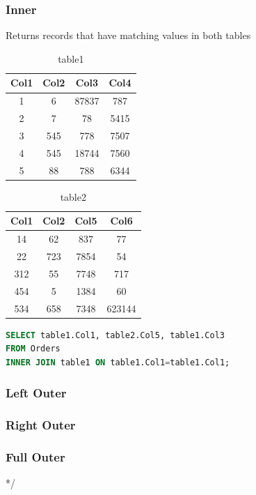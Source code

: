\documentclass{article}
\begin{document}
\subsubsection*{Inner}
Returns records that have matching values in both tables
\begin{table}
\begin{center}
 \begin{tabular}{|c c c c|} 
 \hline
 Col1 & Col2 & Col3 & Col4 \\ [0.5ex] 
 \hline\hline
 1 & 6 & 87837 & 787 \\ 
 \hline
 2 & 7 & 78 & 5415 \\
 \hline
 3 & 545 & 778 & 7507 \\
 \hline
 4 & 545 & 18744 & 7560 \\
 \hline
 5 & 88 & 788 & 6344 \\ [1ex] 
 \hline
 
\end{tabular}
\end{center}
\caption{table1}
\end{table}
\begin{table}
\begin{center}
\begin{tabular}{|c c c c|} 
 \hline
 Col1 & Col2 & Col5 & Col6 \\ [0.5ex] 
 \hline\hline
 14 & 62 & 837 & 77 \\ 
 \hline
 22 & 723 & 7854 & 54 \\
 \hline
 312 & 55 & 7748 & 717 \\
 \hline
 454 & 5 & 1384 & 60 \\
 \hline
 534 & 658 & 7348 & 623144 \\ [1ex] 
 \hline
 
\end{tabular}
\end{center}
\caption{table2}
\end{table}
\begin{lstlisting}[language=SQL]
SELECT table1.Col1, table2.Col5, table1.Col3 
FROM Orders 
INNER JOIN table1 ON table1.Col1=table1.Col1;
\end{lstlisting}
\subsubsection*{Left Outer}
\subsubsection*{Right Outer}
\subsubsection*{Full Outer}
*/
\end{document}
